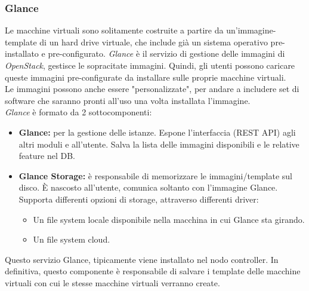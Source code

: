 \documentclass{article}
\begin{document}
\subsubsection{Glance}
Le macchine virtuali sono solitamente costruite a partire da un'immagine-template di un hard drive virtuale, che include già un sistema operativo pre-installato e pre-configurato. \textit{Glance} è il servizio di gestione delle immagini di \textit{OpenStack}, gestisce le sopracitate immagini. Quindi, gli utenti possono caricare queste immagini pre-configurate da installare sulle proprie macchine virtuali. \\
Le immagini possono anche essere "personalizzate", per andare a includere set di software che saranno pronti all'uso una volta installata l'immagine. \\
\textit{Glance} è formato da 2 sottocomponenti: 
\begin{itemize}
    \item \textbf{Glance:} per la gestione delle istanze. Espone l'interfaccia (REST API) agli altri moduli e all'utente. Salva la lista delle immagini disponibili e le relative feature nel DB.
    \item \textbf{Glance Storage:} è responsabile di memorizzare le immagini/template sul disco. È nascosto all'utente, comunica soltanto con l'immagine Glance. Supporta differenti opzioni di storage, attraverso differenti driver:
    \begin{itemize}
        \item Un file system locale disponibile nella macchina in cui Glance sta girando.
        \item Un file system cloud.
    \end{itemize}
\end{itemize}
Questo servizio Glance, tipicamente viene installato nel nodo controller. In definitiva, questo componente è responsabile di salvare i template delle macchine virtuali con cui le stesse macchine virtuali verranno create.
\end{document}
